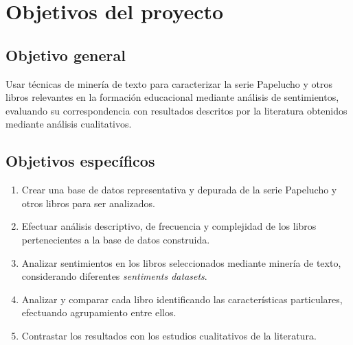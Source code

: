 \chapter{Objetivos del proyecto}\label{intro:objetivos}    

        
\section{Objetivo general}

Usar técnicas de minería de texto para caracterizar la serie Papelucho y otros libros relevantes en la formación educacional mediante análisis de sentimientos, evaluando su correspondencia con resultados descritos por la literatura obtenidos mediante análisis cualitativos.

        
\section{Objetivos específicos}

\begin{enumerate}

\item Crear una base de datos representativa y depurada de la serie Papelucho y otros libros para ser analizados.

\item Efectuar análisis descriptivo, de frecuencia y complejidad de los libros pertenecientes a la base de datos construida.

\item Analizar sentimientos en los libros seleccionados mediante minería de texto, considerando diferentes \textit{sentiments datasets}.

\item Analizar y comparar cada libro identificando las características particulares, efectuando agrupamiento entre ellos.

\item Contrastar los resultados con los estudios cualitativos de la literatura.

\end{enumerate}

